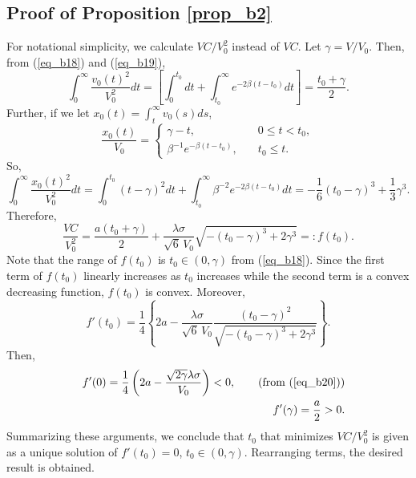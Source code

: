 \subsection{Proof of Proposition \ref{prop_b2}}
 For notational simplicity, we calculate $VC/V_0^2$ instead of $VC$.
 Let $\gamma = V/V_0$.
 Then, from (\ref{eq_b18}) and (\ref{eq_b19}),
\[
  \int_0^\infty \frac{v_0(t)^2}{V_0^2} dt = 
  \left[ \int_0^{t_0} dt + \int_{t_0}^\infty e^{-2\beta(t-t_0)} dt \right]
  = \frac{t_0+\gamma}{2}.
\]
 Further, if we let $x_0(t) = \int_t^\infty v_0(s) ds$,
\[
  \frac{x_0(t)}{V_0}
   = \left\{
   \begin{array}{ll}
    \gamma - t, & \quad 0 \leq t < t_0, \\
    \beta^{-1} e^{-\beta(t-t_0)}, & \quad t_0 \leq t.
   \end{array}
   \right.
\]
 So,
\[
  \int_0^\infty \frac{x_0(t)^2}{V_0^2} dt
   = \int_0^{t_0} (t-\gamma)^2 dt + \int_{t_0}^\infty \beta^{-2}
     e^{-2\beta (t-t_0)} dt
   = -\frac{1}{6} (t_0 - \gamma)^3 + \frac{1}{3} \gamma^3.
\]
 Therefore,
\begin{equation}\label{eq_b31}
  \frac{VC}{V_0^2} = \frac{a(t_0+\gamma)}{2} + \frac{\lambda \sigma}{\sqrt{6}\,V_0}
  \sqrt{-(t_0-\gamma)^3+2\gamma^3} =: f(t_0).
\end{equation}
 Note that the range of $f(t_0)$ is $t_0 \in (0,\gamma)$ from (\ref{eq_b18}).
 Since the first term of $f(t_0)$ linearly increases as $t_0$ increases while the second
term is a convex decreasing function, $f(t_0)$ is convex.
 Moreover,
\[
  f'(t_0) = \frac{1}{4} \left\{ 2a - \frac{\lambda \sigma}{\sqrt{6} \, V_0}
  \frac{(t_0-\gamma)^2}{\sqrt{-(t_0-\gamma)^3+2\gamma^3}} \right\}.
\]
 Then,
\begin{eqnarray*}
  & & f'(0) = \frac{1}{4} \left( 2a - \frac{\sqrt{2\gamma}\lambda\sigma}{V_0} \right) < 0, \qquad
              \mbox{(from (\ref{eq_b20}))} \\
  & & f'(\gamma) = \frac{a}{2} > 0.
\end{eqnarray*}
 Summarizing these arguments, we conclude that $t_0$ that minimizes $VC/V_0^2$ is given
as a unique solution of $f'(t_0)=0$, $t_0 \in (0,\gamma)$.
 Rearranging terms, the desired result is obtained.

